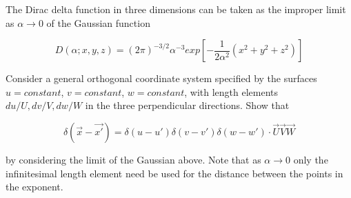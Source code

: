 \begin{question}

The Dirac delta function in three dimensions can be taken as the
improper limit as $\alpha \rightarrow 0$ of the Gaussian function

\begin{equation}
  D(\alpha; x, y, z) = (2\pi)^{-3/2}\alpha^{-3}exp\left[- \frac{1}{2\alpha^2}
    (x^2 + y^2 + z^2)\right]
\end{equation}

Consider a general orthogonal coordinate system specified by the
surfaces $u = constant$, $v = constant$, $w = constant$, with length
elements $du/U, dv/V, dw/W$ in the three perpendicular directions.
Show that

\begin{equation}
  \delta(\vec{x} - \vec{x'}) = \delta(u - u')\delta(v - v')\delta(w -
  w')\cdot \vec{U}\vec{V}\vec{W}
\end{equation}

by considering the limit of the Gaussian above.  Note that as $\alpha
\rightarrow 0$ only the infinitesimal length element need be used for
the distance between the points in the exponent.

\end{question}
